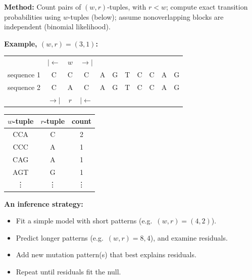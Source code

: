 \documentclass[fontscale=0.38]{baposter}
\newcommand\tLL[1]{\multicolumn{1}{|c}{#1}}
\newcommand\tRR[1]{\multicolumn{1}{c|}{#1}}
\newcommand\tLR[1]{\multicolumn{1}{|c|}{#1}}
\begin{document}
\begin{poster}
{    \vspace{1em}

    \textbf{Method:}
Count pairs of $(w,r)$-tuples, with $r<w$;
compute exact transition probabilities using $w$-tuples (below);
assume nonoverlapping blocks are independent (binomial likelihood).

\vspace{1em}

\textbf{Example, $(w,r)=(3,1)$:}
  \begin{center} 
    \setlength{\tabcolsep}{0pt} 
    \begin{tabular}{r cccccccccc}
        & $\vert\!\leftarrow$ & $w$ & $\rightarrow\!\vert$ & &&&&&& \\
      \cline{2-4}
      sequence 1 \hspace{2em} & \tLL{C}&C&\tRR{C}&A&G&T&C&C&A&G\\
      \cline{2-2}\cline{4-4}
      sequence 2 \hspace{2em} & C&\tLR{A}&C&A&G&T&C&C&A&G\\
      \cline{3-3}
      & $\rightarrow\!\vert$ & $r$ & $\vert\!\leftarrow$ & &&&&&& \\
    \end{tabular} 
    \hspace{5em}
    \setlength{\tabcolsep}{5pt} 
    \begin{tabular}{c c c}
      $w$-tuple & $r$-tuple & count \\
      \hline
      CCA & C & 2 \\
      CCC & A & 1 \\
      CAG & A & 1 \\
      AGT & G & 1 \\
      \vdots & \vdots & \vdots \\
      \hline
    \end{tabular}
  \end{center} 

  \vspace{1em}

  \textbf{An inference strategy:}
  \begin{itemize}
    \item Fit a simple model with short patterns (e.g.\ $(w,r)=(4,2)$).
    \item Predict longer patterns (e.g.\ $(w,r)=8,4$), and examine residuals.
    \item Add new mutation pattern(s) that best explains residuals.
    \item Repeat until residuals fit the null.
  \end{itemize}

}
\end{poster}
\end{document}
